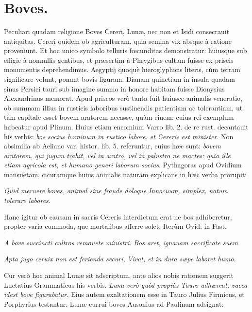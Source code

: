 \documentclass[a4paper, 11pt, oneside, polutonikogreek, latin]{article}
\begin{document}
\section{Boves.}
\paragraph{}
Peculiari quadam religione Boves Cereri, Lunæ, nec non et Isidi consecrauit antiquitas. Cereri quidem ob agriculturam, quia semina vix absque à ratione proveniunt. Et hoc unico symbolo telluris fœcunditas demonstratur: huiusque sub effigie à nonnullis gentibus, et præsertim à Phrygibus cultam fuisse ex priscis monumentis deprehendimus. Aegyptij quoquè hieroglyphicis literis, cùm terram significare volunt, ponunt bovis figuram. Dianam quinetiam in insula quadam sinus Persici tauri sub imagine summo in honore habitam fuisse Dionysius Alexandrinus memorat. Apud priscos verò tanta fuit huiusce animalis veneratio, ob summam illius in rusticis laboribus sustinendis patientiam ac tolerantiam, ut tàm capitale esset bovem aratorem necasse, quàm ciuem: cuius rei exemplum habeatur apud Plinum. Huius etiam encomium Varro lib. 2. de re rust. decantauit his verbis: \emph{bos socius hominum in rustico labore, et Cereris est minister}. Non absimilia ab Aeliano var. histor. lib. 5. referuntur, cuius hæc sunt: \emph{bovem aratorem, qui jugum trahit, vel in aratro, vel in palustro ne mactes: quia ille etiam agricola est, et humano generi laborum socius}. Pythagoras apud Ovidium mansuetam, cicuramque huius animalis naturam explicans in hæc verba prorupit:

\emph{Quid meruere boves, animal sine fraude doloque}
\emph{Innocuum, simplex, natum tolerare labores.}

Hanc igitur ob causam in sacris Cereris interdictum erat ne bos adhiberetur, propter varia commoda, que mortalibus afferre solet. Iterùm Ovid. in Fast.

\emph{A bove succincti cultros remouete ministri.}
\emph{Bos aret, ignauam sacrificate suem.}

\emph{Apta jugo ceruix non est ferienda securi,}
\emph{Vivat, et in dura sæpe laboret humo.}

Cur verò hoc animal Lunæ sit adscriptum, ante alios nobis rationem suggerit Luctatius Grammaticus his verbis. \emph{Luna verò quòd propiùs Tauro adhæreat, vacca idest bove figurabatur.} Eius autem exaltationem esse in Tauro Julius Firmicus, et Porphyrius testantur. Lunæ currui boves Ausonius ad Paulinum adsignat:
\end{document}
